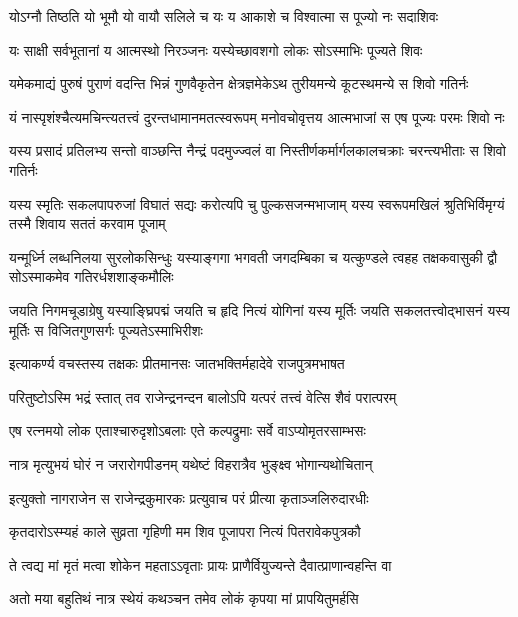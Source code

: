 \twolineshloka
{योऽग्नौ तिष्ठति यो भूमौ यो वायौ सलिले च यः}
{य आकाशे च विश्वात्मा स पूज्यो नः सदाशिवः} %

\twolineshloka
{यः साक्षी सर्वभूतानां य आत्मस्थो निरञ्जनः}
{यस्येच्छावशगो लोकः सोऽस्माभिः पूज्यते शिवः} %

\fourlineindentedshloka
{यमेकमाद्यं पुरुषं पुराणं}
{वदन्ति भिन्नं गुणवैकृतेन}
{क्षेत्रज्ञमेकेऽथ तुरीयमन्ये}
{कूटस्थमन्ये स शिवो गतिर्नः} %

\fourlineindentedshloka
{यं नास्पृशंश्चैत्यमचिन्त्यतत्त्वं}
{दुरन्तधामानमतत्स्वरूपम्}
{मनोवचोवृत्तय आत्मभाजां}
{स एष पूज्यः परमः शिवो नः} %

\fourlineindentedshloka
{यस्य प्रसादं प्रतिलभ्य सन्तो}
{वाञ्छन्ति नैन्द्रं पदमुज्ज्वलं वा}
{निस्तीर्णकर्मार्गलकालचक्राः}
{चरन्त्यभीताः स शिवो गतिर्नः} %

\fourlineindentedshloka
{यस्य स्मृतिः सकलपापरुजां विघातं}
{सद्यः करोत्यपि चु पुल्कसजन्मभाजाम्}
{यस्य स्वरूपमखिलं श्रुतिभिर्विमृग्यं}
{तस्मै शिवाय सततं करवाम पूजाम्} %

\fourlineindentedshloka
{यन्मूर्ध्नि लब्धनिलया सुरलोकसिन्धुः}
{यस्याङ्गगा भगवती जगदम्बिका च}
{यत्कुण्डले त्वहह तक्षकवासुकी द्वौ}
{सोऽस्माकमेव गतिरर्धशशाङ्कमौलिः} %

\fourlineindentedshloka
{जयति निगमचूडाग्रेषु यस्याङ्घ्रिपद्मं}
{जयति च हृदि नित्यं योगिनां यस्य मूर्तिः}
{जयति सकलतत्त्वोद्भासनं यस्य मूर्तिः}
{स विजितगुणसर्गः पूज्यतेऽस्माभिरीशः} %

\twolineshloka
{इत्याकर्ण्य वचस्तस्य तक्षकः प्रीतमानसः}
{जातभक्तिर्महादेवे राजपुत्रमभाषत} %

\twolineshloka
{परितुष्टोऽस्मि भद्रं स्तात् तव राजेन्द्रनन्दन}
{बालोऽपि यत्परं तत्त्वं वेत्सि शैवं परात्परम्} %

\twolineshloka
{एष रत्नमयो लोक एताश्चारुदृशोऽबलाः}
{एते कल्पद्रुमाः सर्वे वाऽप्योमृतरसाम्भसः} %

\twolineshloka
{नात्र मृत्युभयं घोरं न जरारोगपीडनम्}
{यथेष्टं विहरात्रैव भुङ्क्ष्व भोगान्यथोचितान्} %

\twolineshloka
{इत्युक्तो नागराजेन स राजेन्द्रकुमारकः}
{प्रत्युवाच परं प्रीत्या कृताञ्जलिरुदारधीः} %

\twolineshloka
{कृतदारोऽस्म्यहं काले सुव्रता गृहिणी मम}
{शिव पूजापरा नित्यं पितरावेकपुत्रकौ} %

\twolineshloka
{ते त्वद्य मां मृतं मत्वा शोकेन महताऽऽवृताः}
{प्रायः प्राणैर्वियुज्यन्ते दैवात्प्राणान्वहन्ति वा} %

\twolineshloka
{अतो मया बहुतिथं नात्र स्थेयं कथञ्चन}
{तमेव लोकं कृपया मां प्रापयितुमर्हसि} %

